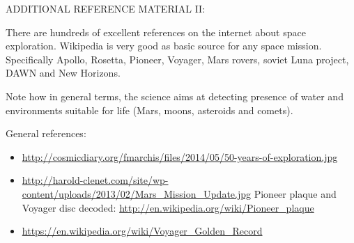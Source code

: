 ADDITIONAL REFERENCE MATERIAL II:

There are hundreds of excellent references on the internet about space exploration. Wikipedia is very good as basic source for any space mission. Specifically Apollo, Rosetta, Pioneer, Voyager, Mars rovers, soviet Luna project, DAWN and New Horizons.

Note how in general terms, the science aims at detecting presence of water and environments suitable for life (Mars, moons, asteroids and comets).

General references:
\begin{itemize}
\item \url{http://cosmicdiary.org/fmarchis/files/2014/05/50-years-of-exploration.jpg}
\item \url{http://harold-clenet.com/site/wp-content/uploads/2013/02/Mars_Mission_Update.jpg}
Pioneer plaque and Voyager disc decoded: \url{http://en.wikipedia.org/wiki/Pioneer_plaque} 
\item \url{https://en.wikipedia.org/wiki/Voyager_Golden_Record}
\end{itemize}